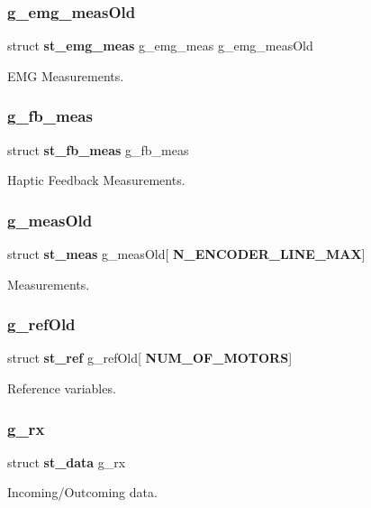 \subsubsection{g\+\_\+emg\+\_\+meas\+Old}
{\footnotesize\ttfamily struct \textbf{ st\+\_\+emg\+\_\+meas} g\+\_\+emg\+\_\+meas g\+\_\+emg\+\_\+meas\+Old}

E\+MG Measurements. \mbox{\label{globals_8h_af8d2d84570b7e85614e0455a23177e62}} 
\subsubsection{g\+\_\+fb\+\_\+meas}
{\footnotesize\ttfamily struct \textbf{ st\+\_\+fb\+\_\+meas} g\+\_\+fb\+\_\+meas}

Haptic Feedback Measurements. \mbox{\label{globals_8h_a7b175385b2b9418fa7159c72d0f470fd}} 
\subsubsection{g\+\_\+meas\+Old}
{\footnotesize\ttfamily struct \textbf{ st\+\_\+meas} g\+\_\+meas\+Old[\textbf{ N\+\_\+\+E\+N\+C\+O\+D\+E\+R\+\_\+\+L\+I\+N\+E\+\_\+\+M\+AX}]}

Measurements. \mbox{\label{globals_8h_aab927f8d9bc1a835daed821aa97b9335}} 
\subsubsection{g\+\_\+ref\+Old}
{\footnotesize\ttfamily struct \textbf{ st\+\_\+ref} g\+\_\+ref\+Old[\textbf{ N\+U\+M\+\_\+\+O\+F\+\_\+\+M\+O\+T\+O\+RS}]}

Reference variables. \mbox{\label{globals_8h_aa963ce8fafc11e104eb7ee22982d0345}} 
\subsubsection{g\+\_\+rx}
{\footnotesize\ttfamily struct \textbf{ st\+\_\+data} g\+\_\+rx}

Incoming/\+Outcoming data. \mbox{\label{globals_8h_a1e6fda88dfdabc63859f8907eb702920}} 
